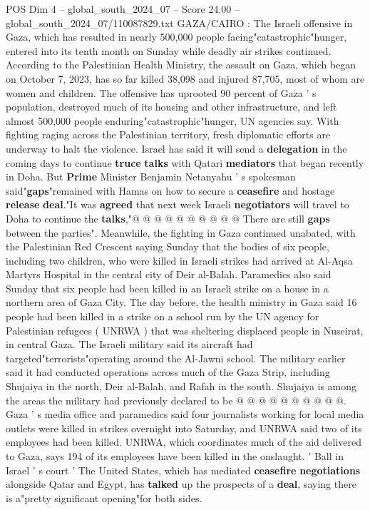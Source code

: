 \begin{textsample}{POS Dim 4 – global\_south\_2024\_07 – Score 24.00 – global\_south\_2024\_07/110087829.txt}  \label{ex:f4_pos_116}
GAZA/CAIRO : The Israeli offensive in Gaza, which has resulted in nearly 500,000 people facing"catastrophic"hunger, entered into its tenth month on Sunday while deadly air strikes continued.
According to the Palestinian Health Ministry, the assault on Gaza, which began on October 7, 2023, has so far killed 38,098 and injured 87,705, most of whom are women and children.
The offensive has uprooted 90 percent of Gaza ' s population, destroyed much of its housing and other infrastructure, and left almost 500,000 people enduring"catastrophic"hunger, UN agencies say.
With fighting raging across the Palestinian territory, fresh diplomatic efforts are underway to halt the violence.
Israel has said it will send a \textbf{delegation} in the coming days to continue \textbf{truce} \textbf{talks} with Qatari \textbf{mediators} that began recently in Doha.
But \textbf{Prime} Minister Benjamin Netanyahu ' s spokesman said"\textbf{gaps}"remained with Hamas on how to secure a \textbf{ceasefire} and hostage \textbf{release} \textbf{deal}."It was \textbf{agreed} that next week Israeli \textbf{negotiators} will travel to Doha to continue the \textbf{talks},"@ @ @ @ @ @ @ @ @ @ There are still \textbf{gaps} between the parties".
Meanwhile, the fighting in Gaza continued unabated, with the Palestinian Red Crescent saying Sunday that the bodies of six people, including two children, who were killed in Israeli strikes had arrived at Al-Aqsa Martyrs Hospital in the central city of Deir al-Balah.
Paramedics also said Sunday that six people had been killed in an Israeli strike on a house in a northern area of Gaza City.
The day before, the health ministry in Gaza said 16 people had been killed in a strike on a school run by the UN agency for Palestinian refugees ( UNRWA ) that was sheltering displaced people in Nuseirat, in central Gaza.
The Israeli military said its aircraft had targeted"terrorists"operating around the Al-Jawni school.
The military earlier said it had conducted operations across much of the Gaza Strip, including Shujaiya in the north, Deir al-Balah, and Rafah in the south.
Shujaiya is among the areas the military had previously declared to be @ @ @ @ @ @ @ @ @ @.
Gaza ' s media office and paramedics said four journalists working for local media outlets were killed in strikes overnight into Saturday, and UNRWA said two of its employees had been killed.
UNRWA, which coordinates much of the aid delivered to Gaza, says 194 of its employees have been killed in the onslaught. ' Ball in Israel ' s court ' The United States, which has mediated \textbf{ceasefire} \textbf{negotiations} alongside Qatar and Egypt, has \textbf{talked} up the prospects of a \textbf{deal}, saying there is a"pretty significant opening"for both sides.

\end{textsample}
